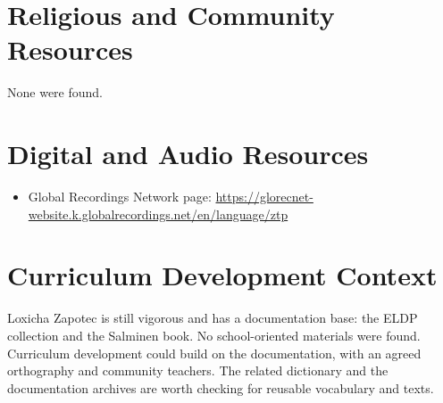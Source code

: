 \documentclass[12pt]{article}
\begin{document}
\section{Religious and Community Resources}
None were found.

\section{Digital and Audio Resources}
\begin{itemize}
\item Global Recordings Network page: \url{https://glorecnet-website.k.globalrecordings.net/en/language/ztp}
\end{itemize}

\section{Curriculum Development Context}
Loxicha Zapotec is still vigorous and has a documentation base: the ELDP collection and the Salminen book. No school-oriented materials were found. Curriculum development could build on the documentation, with an agreed orthography and community teachers. The related dictionary and the documentation archives are worth checking for reusable vocabulary and texts.
\end{document}
